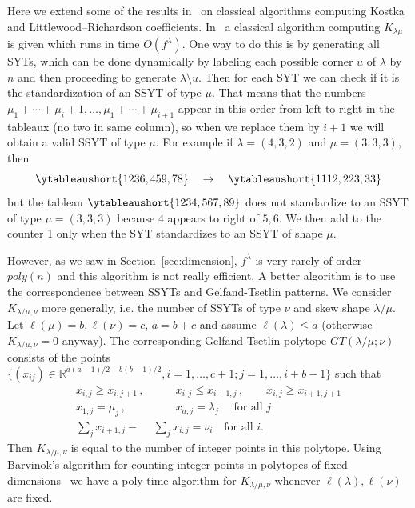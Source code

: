 \documentclass[11pt]{amsart}
\theoremstyle{plain}
\theoremstyle{definition}
\numberwithin{equation}{section}
\newcommand{\la}{\lambda}
\newcommand{\poly}{poly}
\def\la{\lambda}
\begin{document}
Here we extend some of the results in~\cite{LH24} on classical algorithms computing Kostka and Littlewood--Richardson coefficients. In~\cite{LH24} a classical algorithm computing $K_{\la\mu}$ is given which runs in time $O(f^\la)$. One way to do this is by generating all SYTs, which can be done dynamically by labeling each possible corner $u$ of $\la$ by $n$ and then proceeding to generate $\la \setminus u$. Then for each SYT we can check if it is the standardization of an SSYT of type $\mu$. That means that the numbers $\mu_1+\cdots+\mu_i+1,\ldots,\mu_1+\cdots+\mu_{i+1}$ appear in this order from left to right in the tableaux (no two in same column), so when we replace them by $i+1$ we will obtain a valid SSYT of type $\mu$. For example if $\la=(4,3,2)$ and $\mu=(3,3,3)$, then
$$\ytableaushort{1236,459,78} \quad \to \quad \ytableaushort{1112,223,33}$$
but the tableau $\ytableaushort{1234,567,89}$ does not standardize to an SSYT of type $\mu=(3,3,3)$ because $4$ appears to right of $5,6$. We then add to the counter 1 only when the SYT standardizes to an SSYT of shape $\mu$. 

However, as we saw in Section~\ref{sec:dimension}, $f^\la$ is very rarely of order $\poly(n)$ and this algorithm is not really efficient. A better algorithm is to use the correspondence between SSYTs and Gelfand-Tsetlin patterns. We consider $K_{\la/\mu,\nu}$ more generally, i.e. the number of SSYTs of type $\nu$ and skew shape $\la/\mu$. Let $ \ell(\mu)=b,\ell(\nu)=c$, $a=b+c$ and assume $\ell(\la)\leq a$ (otherwise $K_{\la/\mu,\nu}=0$ anyway). The corresponding Gelfand-Tsetlin polytope $GT(\la/\mu;\nu)$ consists of the points $\{(x_{ij})\in \mathbb{R}^{ a(a-1)/2-b(b-1)/2}, i=1,\ldots,c+1; j= 1,\ldots, i+b-1\}$ such that 
\begin{align}
  x_{i,j} \geq x_{i,j+1} \, ,& \qquad x_{i,j} \leq x_{i+1,j}  \, , \qquad x_{i,j} \geq x_{i+1,j+1} \\
 x_{1,j} = \mu_j \, ,& \qquad x_{a,j}=\la_j \quad \text{ for all $j$} \\
 \sum_j x_{i+1,j} -& \sum_j x_{i,j} = \nu_i \quad \text{for all $i$}. 
\end{align}
Then $K_{\la/\mu,\nu}$ is equal to the number of integer points in this polytope. Using  Barvinok's algorithm for counting integer points in polytopes of fixed dimensions~\cite{barvinok1994polynomial} we have a poly-time algorithm for $K_{\la/\mu,\nu}$ whenever $\ell(\la), \ell(\nu)$ are fixed.
\end{document}
